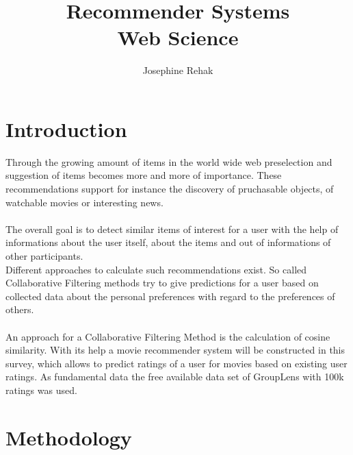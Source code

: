 \documentclass[a4paper,12pt,twoside]{article}
\title{Recommender Systems\\ Web Science}
\author{Josephine Rehak}
\begin{document}
\maketitle
\section{Introduction}
Through the growing amount of items in the world wide web preselection and suggestion of items becomes more and more of importance. These recommendations support for instance the discovery of pruchasable objects, of watchable movies or interesting news.\\
\\
The overall goal is to detect similar items of interest for a user with the help of informations about the user itself, about the items and out of informations of other participants. 
\cite{WebScience}\\
Different approaches to calculate such recommendations exist. So called Collaborative Filtering methods try to give predictions for a user based on collected data about the personal preferences with regard to the preferences of others. \\
\\
An approach for a Collaborative Filtering Method is the calculation of cosine similarity. With its help a movie recommender system will be constructed in this survey, which allows to predict ratings of a user for movies based on existing user ratings. As fundamental data the free available data set of GroupLens with 100k ratings was used. \cite{grouplens}
 

\section{Methodology}
\end{document}
